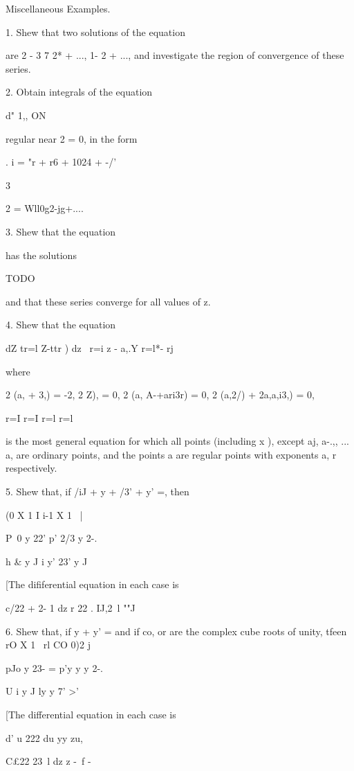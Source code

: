 %
%

Miscellaneous Examples.

1. Shew that two solutions of the equation

are 2 - 3 7 2* + ..., 1- 2 + ..., and investigate the region of
convergence of these series.

2. Obtain integrals of the equation

d" 1,, ON

regular near 2 = 0, in the form

. i = "r + r6 + 1024 + -/'

3

 2 = Wll0g2-jg+....

3. Shew that the equation

has the solutions

TODO

and that these series converge for all values of z.

4. Shew that the equation

dZ tr=l Z-ttr ) dz \ r=i z - a,.Y r=l*- rj

where

2 (a, + 3,) = -2, 2 Z), = 0, 2 (a, A-+ari3r) = 0, 2 (a,2/) + 2a,a,i3,)
= 0,

r=I r=I r=l r=l

is the most general equation for which all points (including x ),
except aj, a-.,, ... a, are ordinary points, and the points a are
regular points with exponents a, r respectively.


5. Shew that, if /iJ + y + /3' + y' =, then

(0 X 1 I i-1 X 1 ~|

P\ 0 y 22' p' 2/3 y 2-. 

h \& y J i y' 23' y J

[The dififerential equation in each case is

c/22 + 2- 1 dz r 22 . IJ,2\ l ""J

6. Shew that, if y + y' = and if co, or are the complex cube roots of
unity, tfeen rO X 1 \ rl CO 0)2 j

pJo y 23- = p'y y y 2-. 

U i y J ly y 7' >'

[The differential equation in each case is

d' u 222 du yy zu,

C£22 23\ l dz z -\ f -

